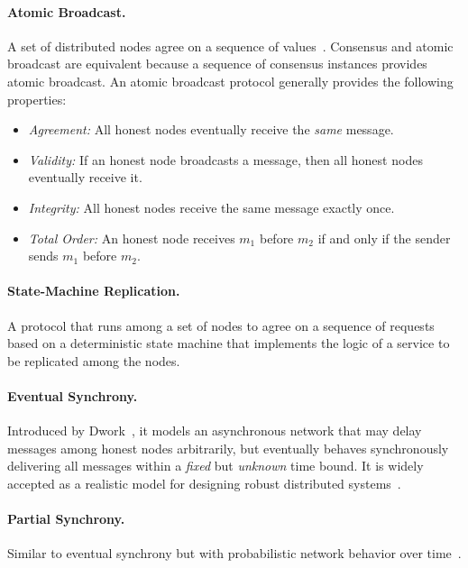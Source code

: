 \documentclass[11pt]{article}
\theoremstyle{mytheoremstyle}
\begin{document}
\paragraph{Atomic Broadcast.}
A set of distributed nodes agree on a sequence of values~\cite{AtomicBroadcast:1993}. Consensus and atomic broadcast are equivalent because a sequence of consensus instances provides atomic broadcast. An atomic broadcast protocol generally provides the following properties:
\begin{itemize}
	\item \textit{Agreement:} All honest nodes eventually receive the \emph{same} message.
	\item \textit{Validity:} If an honest node broadcasts a message, then all honest nodes eventually receive it.
	\item \textit{Integrity:} All honest nodes receive the same message exactly once.
	\item \textit{Total Order:} An honest node receives $m_1$ before $m_2$ if and only if the sender sends $m_1$ before $m_2$.
\end{itemize}

\paragraph{State-Machine Replication.}
A protocol that runs among a set of nodes to agree on a sequence of requests based on a deterministic state machine that implements the logic of a service to be replicated among the nodes.

\paragraph{Eventual Synchrony.} Introduced by Dwork~\cite{dwork:1988:cpp}, it models an asynchronous network that may delay messages among honest nodes arbitrarily, but eventually behaves synchronously delivering all messages within a \emph{fixed} but \emph{unknown} time bound. It is widely accepted as a realistic model for designing robust distributed systems~\cite{DBLP:journals/corr/CachinV17}.

\paragraph{Partial Synchrony.} Similar to eventual synchrony but with probabilistic network behavior over time~\cite{dwork:1988:cpp}.
\end{document}
